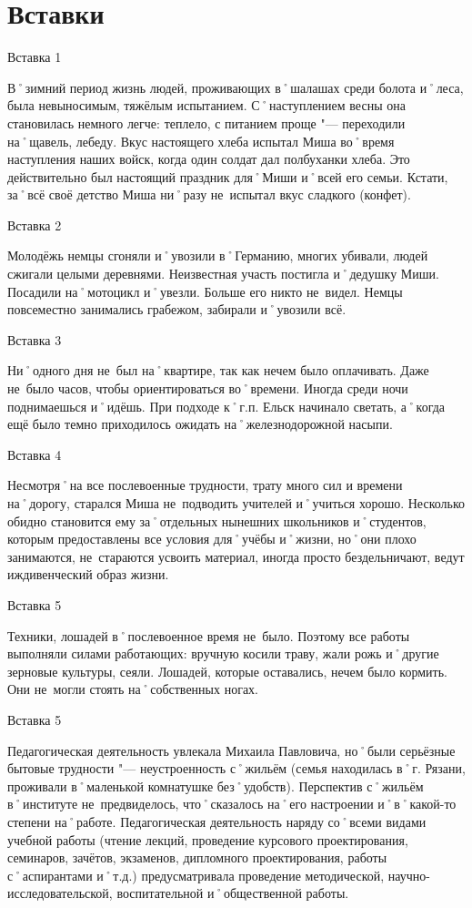 ﻿\chapter{Вставки}


Вставка 1

В˚зимний период жизнь людей, проживающих в˚шалашах среди болота и˚леса, была невыносимым, тяжёлым испытанием. С˚наступлением весны она становилась немного легче: теплело, с питанием проще "--- переходили на˚щавель, лебеду. Вкус настоящего хлеба испытал Миша во˚время наступления наших войск, когда один солдат дал полбуханки хлеба. Это действительно был настоящий праздник для˚Миши и˚всей его семьи. Кстати, за˚всё своё детство Миша ни˚разу не~испытал вкус сладкого (конфет).

Вставка 2

Молодёжь немцы сгоняли и˚увозили в˚Германию, многих убивали, людей сжигали целыми деревнями. Неизвестная участь постигла и˚дедушку Миши. Посадили на˚мотоцикл и˚увезли. Больше его никто не~видел.
Немцы повсеместно занимались грабежом, забирали и˚увозили всё.

Вставка 3

Ни˚одного дня не~был на˚квартире, так как нечем было оплачивать. Даже не~было часов, чтобы ориентироваться во˚времени. Иногда среди ночи поднимаешься и˚идёшь. При подходе к˚г.п. Ельск начинало светать, а˚когда ещё было темно приходилось ожидать на˚железнодорожной насыпи.

Вставка 4

Несмотря˚на все послевоенные трудности, трату много сил и времени на˚дорогу, старался Миша не~подводить учителей и˚учиться хорошо.
Несколько обидно становится ему за˚отдельных нынешних школьников и˚студентов, которым предоставлены все условия для˚учёбы и˚жизни, но˚они плохо занимаются, не~стараются усвоить материал, иногда просто бездельничают, ведут иждивенческий образ жизни.

Вставка 5

Техники, лошадей в˚послевоенное время не~было. Поэтому все работы выполняли силами работающих: вручную косили траву, жали рожь и˚другие зерновые культуры, сеяли. Лошадей, которые оставались, нечем было кормить. Они не~могли стоять на˚собственных ногах.

Вставка 5

Педагогическая деятельность увлекала Михаила Павловича, но˚были серьёзные бытовые трудности "--- неустроенность с˚жильём (семья находилась в˚г. Рязани, проживали в˚маленькой комнатушке без˚удобств). Перспектив с˚жильём в˚институте не~предвиделось, что˚сказалось на˚его настроении и˚в˚какой-то степени на˚работе.
Педагогическая деятельность наряду со˚всеми видами учебной работы (чтение лекций, проведение курсового проектирования, семинаров, зачётов, экзаменов, дипломного проектирования, работы с˚аспирантами и˚т.д.) предусматривала проведение методической, научно-исследовательской, воспитательной и˚общественной работы.
 

